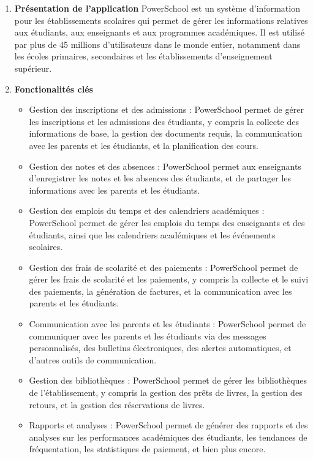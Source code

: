 \begin{enumerate}[label=\alph*]
    \item \textbf{Présentation de l'application} \newline PowerSchool est un système d'information pour les établissements scolaires qui permet de gérer les informations relatives aux étudiants, aux enseignants et aux programmes académiques. Il est utilisé par plus de 45 millions d'utilisateurs dans le monde entier, notamment dans les écoles primaires, secondaires et les établissements d'enseignement supérieur.
    \item \textbf{Fonctionalités clés} 
        \begin{itemize}
            \item Gestion des inscriptions et des admissions : PowerSchool permet de gérer les inscriptions et les admissions des étudiants, y compris la collecte des informations de base, la gestion des documents requis, la communication avec les parents et les étudiants, et la planification des cours.
            \item Gestion des notes et des absences : PowerSchool permet aux enseignants d'enregistrer les notes et les absences des étudiants, et de partager les informations avec les parents et les étudiants.
            \item Gestion des emplois du temps et des calendriers académiques : PowerSchool permet de gérer les emplois du temps des enseignants et des étudiants, ainsi que les calendriers académiques et les événements scolaires.
            \item Gestion des frais de scolarité et des paiements : PowerSchool permet de gérer les frais de scolarité et les paiements, y compris la collecte et le suivi des paiements, la génération de factures, et la communication avec les parents et les étudiants.
            \item Communication avec les parents et les étudiants : PowerSchool permet de communiquer avec les parents et les étudiants via des messages personnalisés, des bulletins électroniques, des alertes automatiques, et d'autres outils de communication.
            \item Gestion des bibliothèques : PowerSchool permet de gérer les bibliothèques de l'établissement, y compris la gestion des prêts de livres, la gestion des retours, et la gestion des réservations de livres.
            \item Rapports et analyses : PowerSchool permet de générer des rapports et des analyses sur les performances académiques des étudiants, les tendances de fréquentation, les statistiques de paiement, et bien plus encore.

\end{itemize}
\end{enumerate}
